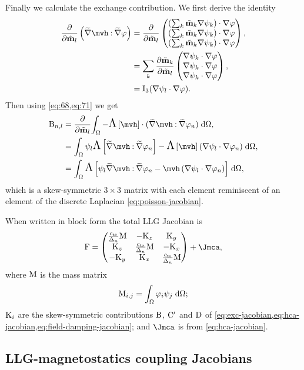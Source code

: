 Finally we calculate the exchange contribution.
We first derive the identity
\begin{equation}
  \begin{aligned}
    \pd{}{\mvdis_l} \left(\gradv \mvh \compdot \gradv \tbf\right)
    &= \pd{}{\mvdis_l} \threevecdup{\left( \sum_k \mvdis_k \grad \sbf_k \right) \cdot \grad \tbf}, \\
    &=  \sum_k \pd{\mvdis_k}{\mvdis_l} \threevecdup{\grad \sbf_k \cdot \grad \tbf}, \\
    &=  \Idm_3 \bigb{ \grad \sbf_l \cdot \grad \tbf }.
    \label{eq:71}
  \end{aligned}
\end{equation}
Then using \cref{eq:68,eq:71} we get
\begin{equation}
  \begin{aligned}
   \Bm_{n,l} &=  \pd{}{\mvdis_l} \intd{- \skewm{\mvh} \cdot (\gradv \mvh \compdot \gradv \tbf_n)} ,\\
    &= \intd{ \sbf_l \skewm{\gradv \mvh \compdot \gradv \tbf_n}
       - \skewm{\mvh} \left( \grad \sbf_l \cdot \grad \tbf_n \right)}, \\
     &= \intd{\skewm{ \sbf_l \gradv \mvh \compdot \gradv \tbf_n
       - \mvh \left( \grad \sbf_l \cdot \grad \tbf_n \right)}},
   \label{eq:exc-jacobian}
   \end{aligned}
 \end{equation}
 which is a skew-symmetric $3\times 3$ matrix with each element reminiscent of an element of the discrete Laplacian \cref{eq:poisson-jacobian}.

When written in block form the total LLG Jacobian is
\begin{equation}
  \Fm =
  \begin{pmatrix}
    \jts \Mm    & -\Km_z       & \Km_y \\
    \Km_z         & \jts\Mm    & -\Km_x \\
    -\Km_y        & \Km_x        & \jts \Mm
  \end{pmatrix} + \Jmca,
  \label{eq:llg-jacobian}
\end{equation}
where $\mathrm{M}$ is the mass matrix
\begin{equation}
  \label{eq:mass-matrix}
  \mathrm{M}_{i,j} = {\int_{\Omega} {\varphi_i \psi_j} {\; \mathrm{{d}}} {\Omega}};
\end{equation}
$\mathrm{K}_i$ are the skew-symmetric contributions $\mathrm{B}$, $\mathrm{C}'$ and $\mathrm{D}$ of \cref{eq:exc-jacobian,eq:hca-jacobian,eq:field-damping-jacobian}; and $\Jmca$ is from \cref{eq:hca-jacobian}.


\subsection{LLG-magnetostatics coupling Jacobians}
\label{sec:llg-magn-coupl}

